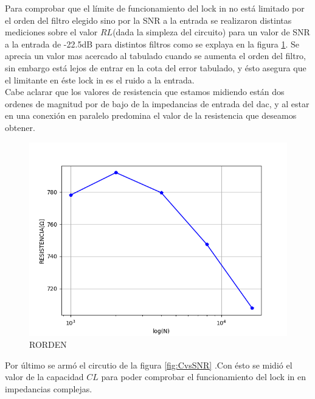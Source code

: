 \documentclass[11pt,a4paper]{extarticle}
\begin{document}
\begin{multicols}{2}
Para comprobar que el límite de funcionamiento 
del lock in no está limitado por el orden del 
filtro elegido sino por la SNR a la entrada
se realizaron distintas mediciones 
sobre el valor $RL$(dada la simpleza del circuito) 
para un valor de SNR a la entrada de -22.5dB para 
distintos filtros como se explaya en la figura 
\ref{fig:RORDEN}. Se aprecia un valor mas acercado 
al tabulado cuando se aumenta el orden del filtro, sin 
embargo está lejos de entrar en la cota del error 
tabulado, y ésto asegura que el limitante en éste 
lock in es el ruido a la entrada.\\

Cabe aclarar que los valores de resistencia que estamos
 midiendo están dos ordenes de magnitud por de 
 bajo de la impedancias de entrada del dac, y al estar en 
una conexión en paralelo predomina el valor de la resistencia 
que deseamos obtener.\\

\begin{figure}[H]
	\centering
	\includegraphics[width=\linewidth]{Images/RORDEN.png}
	\caption{RORDEN}
	\label{fig:RORDEN}
\end{figure}

Por último se armó el circutio de la figura 
\ref{fig:CvsSNR} .Con ésto 
se midió el valor de la capacidad $CL$ para poder 
comprobar el funcionamiento del lock in en 
impedancias complejas.\\ 


\end{multicols}
\end{document}
